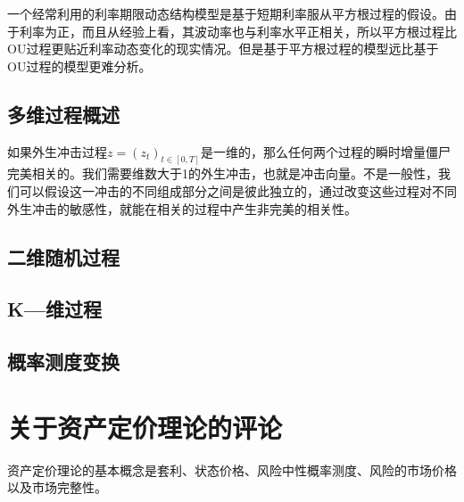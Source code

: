 \documentclass[UTF8]{ctexart}
\begin{document}
一个经常利用的利率期限动态结构模型是基于短期利率服从平方根过程的假设。由于利率为正，而且从经验上看，其波动率也与利率水平正相关，所以平方根过程比OU过程更贴近利率动态变化的现实情况。但是基于平方根过程的模型远比基于OU过程的模型更难分析。

\subsection{多维过程概述}

如果外生冲击过程$z=(z_t)_{t \in [0,T]}$是一维的，那么任何两个过程的瞬时增量僵尸完美相关的。我们需要维数大于1的外生冲击，也就是冲击向量。不是一般性，我们可以假设这一冲击的不同组成部分之间是彼此独立的，通过改变这些过程对不同外生冲击的敏感性，就能在相关的过程中产生非完美的相关性。

\subsection{二维随机过程}

\subsection{K---维过程}

\subsection{概率测度变换}

\section{关于资产定价理论的评论}

资产定价理论的基本概念是套利、状态价格、风险中性概率测度、风险的市场价格以及市场完整性。
\end{document}
